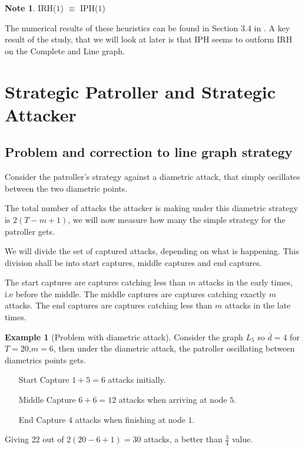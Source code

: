 \documentclass[a4paper,10pt]{article}
\theoremstyle{definition}
\theoremstyle{definition}
\newtheorem{example}[theorem]{Example}
\theoremstyle{remark}
\theoremstyle{definition}
\newtheorem*{note}{Note}
\begin{document}
\begin{note}
IRH($1$) $\equiv$ IPH($1$)
\end{note}

The numerical results of these heuristics can be found in Section 3.4 in \citep{Lin2013}. A key result of the study, that we will look at later is that IPH seems to outform IRH on the Complete and Line graph.

\section{Strategic Patroller and Strategic Attacker}
\label{Section:Strategic Patroller and Strategic Attacker}
\subsection{Problem and correction to line graph strategy}
\label{Subsection:Problem and correction to line graph strategy}
Consider the patroller's strategy against a diametric attack, that simply oscillates between the two diametric points.

The total number of attacks the attacker is making under this diametric strategy is $2(T-m+1)$, we will now measure how many the simple strategy for the patroller gets.

We will divide the set of captured attacks, depending on what is happening. This division shall be into start captures, middle captures and end captures.

The start captures are captures catching less than $m$ attacks in the early times, i.e before the middle. The middle captures are captures catching exactly $m$ attacks. The end captures are captures catching less than $m$ attacks in the late times.

\begin{example}[Problem with diametric attack]
Consider the graph $L_{5}$ so $\bar{d}=4$ for $T=20$,$m=6$, then under the diametric attack, the patroller oscillating between diametrics points gets.
\begin{itemize}
\item[Start] Capture $1+5=6$ attacks initially.
\item[Middle] Capture $6+6=12$ attacks when arriving at node $5$.
\item[End] Capture $4$ attacks when finishing at node $1$.
\end{itemize}
Giving $22$ out of $2(20-6+1)=30$ attacks, a better than $\frac{3}{4}$ value.
\end{example}
\end{document}
